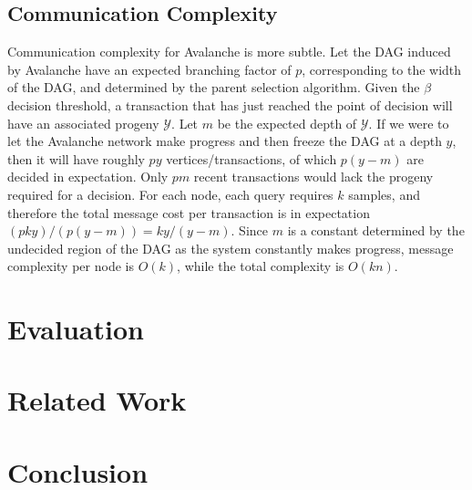 \documentclass[letterpaper,twocolumn,10pt]{article}
\newcommand{\tronly}[2]{#1}
\newcommand{\editinsert}[1]{{\color{blue}#1}}
\theoremstyle{definition}
\begin{document}
\editinsert{%
\subsection{Communication Complexity}
Communication complexity for Avalanche is more subtle.
Let the DAG induced by Avalanche have an expected branching factor of $p$, corresponding to the width of the DAG, and determined by the parent selection algorithm.
Given the $\beta$ decision threshold, a transaction that has just reached the point of decision will have an associated progeny $\mathcal{Y}$.
Let $m$ be the expected depth of $\mathcal{Y}$.
If we were to let the Avalanche network make progress and then freeze the DAG at a depth $y$,
then it will have roughly $py$ vertices/transactions, of which $p(y - m)$ are decided in expectation.
Only $pm$ recent transactions would lack the progeny required for a decision.
For each node, each query requires $k$ samples, and therefore the total message cost per transaction is in expectation $(pky) / (p(y - m)) = ky/(y-m)$.
Since $m$ is a constant determined by the undecided region of the DAG as the system constantly makes progress, message complexity per node is $O(k)$, while the total complexity is $O(kn)$.
}

\section{Evaluation}\tronly{}{\vspace{-0.5em}}
\label{sec:evaluation}


\section{Related Work}\tronly{}{\vspace{-0.5em}}
\label{sec:related-work}


\section{Conclusion}\tronly{}{\vspace{-0.5em}}
\label{sec:conclusions}
\end{document}
